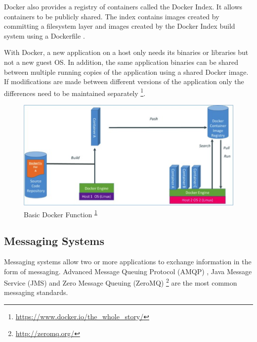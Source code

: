 \documentclass[a4paper,11pt,twoside]{article}
\begin{document}
Docker also provides a registry of containers called the Docker Index. It allows containers to be publicly shared. The index contains images created by committing a filesystem layer and images created by the Docker Index build system using a Dockerfile \cite{docker2}.
   
With Docker, a new application on a host only needs its binaries or libraries but not a new guest OS. In addition, the same application binaries can be shared between multiple running copies of the application using a shared Docker image. If modifications are made between different versions of the application only the differences need to be maintained separately \footnote{\label{dockerC} \url{https://www.docker.io/the_whole_story/}}. \\

\begin{figure}[!ht]
  \centering
     \includegraphics[scale=1]{docker}
  \caption{Basic Docker Function \textsuperscript{\ref{dockerC}}} %
  \label{docker}
\end{figure}
\vspace{-18pt}


\noindent
\subsection{Messaging Systems} \label{MOM}
Messaging systems allow two or more applications to exchange information in the form of messaging. Advanced Message Queuing Protocol (AMQP) \cite{AMPQ}, Java Message Service (JMS) \cite{JMS} and Zero Message Queuing (ZeroMQ) \footnote{\label{ZeroMQ_1} \url{http://zeromq.org/}} are the most common messaging standards. 
\end{document}
